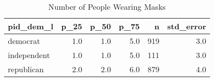 \begin{table}[!htb]
\centering
\caption{Number of People Wearing Masks} 
\label{tab:trump_sum}
\begin{tabular}{lrrrrr}
  \hline
pid\_dem\_l & p\_25 & p\_50 & p\_75 & n & std\_error \\ 
  \hline
democrat & 1.0 & 1.0 & 5.0 & 919 & 3.0 \\ 
  independent & 1.0 & 1.0 & 5.0 & 111 & 3.0 \\ 
  republican & 2.0 & 2.0 & 6.0 & 879 & 4.0 \\ 
   \hline
\end{tabular}
\end{table}
